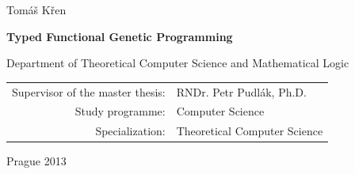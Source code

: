 \documentclass[12pt,a4paper]{report}
\begin{document}
\begin{center}
{\LARGE Tomáš Křen}

\vspace{15mm}

{\LARGE\bfseries Typed Functional Genetic Programming}

\vfill

{\fontsize{0.46cm}{1em}\selectfont 
Department of Theoretical Computer Science and Mathematical Logic}

\vfill

\begin{tabular}{rl}

Supervisor of the master thesis: & RNDr. Petr Pudlák, Ph.D. \\
\noalign{\vspace{2mm}}
Study programme: & Computer Science \\ %
\noalign{\vspace{2mm}}
Specialization: & Theoretical Computer Science
\end{tabular}

\vfill

Prague 2013

\end{center}

\newpage



\end{document}
